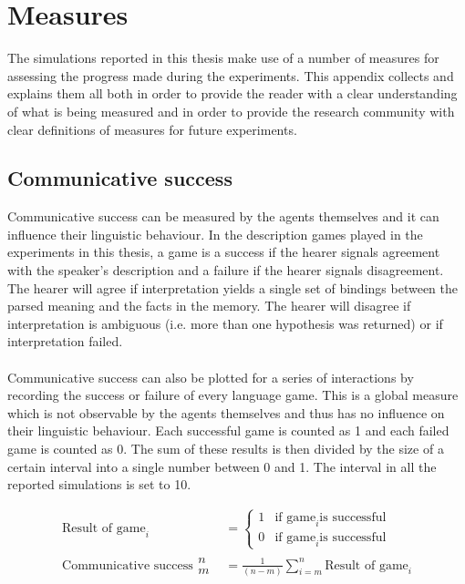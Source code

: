
\chapter*{Measures}
\label{a:measures}

The simulations reported in this thesis make use of a number of measures for assessing the progress made during the experiments. This appendix collects and explains them all both in order to provide the reader with a clear understanding of what is being measured and in order to provide the research community with clear definitions of measures for future experiments.

\section*{Communicative success}

 Communicative success can be measured by the agents themselves and it can influence their linguistic behaviour. In the description games played in the experiments in this thesis, a game is a success if the hearer signals agreement with the speaker's description and a failure if the hearer signals disagreement. The hearer will agree if interpretation yields a single set of bindings between the parsed meaning and the facts in the memory. The hearer will disagree if interpretation is ambiguous (i.e. more than one hypothesis was returned) or if interpretation failed.
\\
\\
 Communicative success can also be plotted for a series of interactions by recording the success or failure of every language game. This is a global measure which is not observable by the agents themselves and thus has no influence on their linguistic behaviour. Each successful game is counted as 1 and each failed game is counted as 0. The sum of these results is then divided by the size of a certain interval into a single number between 0 and 1. The interval in all the reported simulations is set to 10.

\begin{align*}
\text{Result of game}_i &= \left\{ 
\begin{array}{ll} 
1 & \text{if game}_i \text{is successful} \\
0 & \text{if game}_i \text{is successful}
\end{array} \right.
\\
\text{Communicative success}
\begin{array}{ll}
n \\
m
\end{array}
 &= \frac{1}{(n-m)} \sum_{i=m}^n \text{Result of game}_i
\end{align*}

